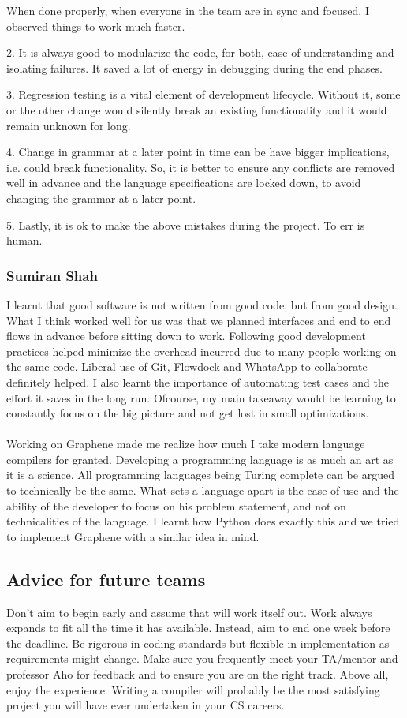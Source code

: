 \documentclass[a4paper]{article}
\begin{document}
When done properly, when everyone in the team are in sync and focused, I observed things to work much faster.

2.       It is always good to modularize the code, for both, ease of understanding and isolating failures. It saved a lot of energy in debugging during the end phases.

3.       Regression testing is a vital element of development lifecycle.  Without it, some or the other change would silently break an existing functionality and it would remain unknown for long.

4.       Change in grammar at a later point in time can be have bigger implications, i.e. could break functionality. So, it is better to ensure any conflicts are removed well in advance and the language specifications are locked down, to avoid changing the grammar at a later point.

5.       Lastly, it is ok to make the above mistakes during the project. To err is human.
\subsubsection{Sumiran Shah}
I learnt that good software is not written from good code, but from good design. What I think worked well for us was that we planned interfaces and end to end flows in advance before sitting down to work. Following good development practices helped minimize the overhead incurred due to many people working on the same code. Liberal use of Git, Flowdock and WhatsApp to collaborate definitely helped.
I also learnt the importance of automating test cases and the effort it saves in the long run. Ofcourse, my main takeaway would be learning to constantly focus on the big picture and not get lost in small optimizations.
\\
\\
Working on Graphene made me realize how much I take modern language compilers for granted. Developing a programming language is as much an art as it is a science. All programming languages being Turing complete can be argued to technically be the same.
What sets a language apart is the ease of use and the ability of the developer to focus on his problem statement, and not on technicalities of the language. I learnt how Python does exactly this and we tried to implement Graphene with a similar idea in mind.
\newline

\subsection{Advice for future teams}
Don't aim to begin early and assume that will work itself out. Work always expands to fit all the time it has available. Instead, aim to end one week before the deadline. Be rigorous in coding standards but flexible in implementation as requirements might change. Make sure you frequently meet your TA/mentor and professor Aho for feedback and to ensure you are on the right track. Above all, enjoy the experience. Writing a compiler will probably be the most satisfying project you will have ever undertaken in your CS careers.
\end{document}

